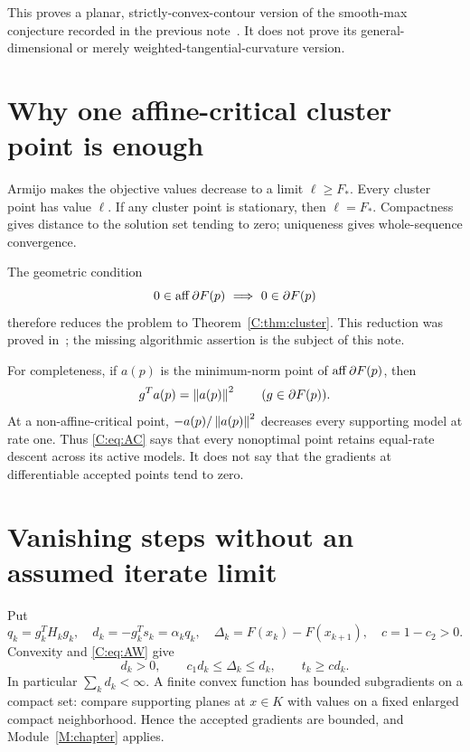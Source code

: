 \documentclass[10pt,oneside,openany]{book}
\theoremstyle{remark}\newtheorem{remark}{Remark}[chapter]
\begin{document}
This proves a planar, strictly-convex-contour version of the smooth-max conjecture recorded in the previous note~\cite{SA}. It does not prove its general-dimensional or merely weighted-tangential-curvature version.


\setcounter{section}{1}
\setcounter{theorem}{3}
\setcounter{equation}{3}
\section{Why one affine-critical cluster point is enough}
Armijo makes the objective values decrease to a limit $\ell\ge F_*$. Every cluster point has value $\ell$. If any cluster point is stationary, then $\ell=F_*$. Compactness gives distance to the solution set tending to zero; uniqueness gives whole-sequence convergence.

The geometric condition
\begin{equation}\label{C:eq:AC}
 0\in\operatorname{aff}\partial F(p)\ \Longrightarrow\ 0\in\partial F(p)
\end{equation}
therefore reduces the problem to Theorem~\ref{C:thm:cluster}. This reduction was proved in~\cite{SA}; the missing algorithmic assertion is the subject of this note.

For completeness, if $a(p)$ is the minimum-norm point of $\operatorname{aff}\partial F(p)$, then
\[
 g^Ta(p)=\left\lVert a(p)\right\rVert^2\qquad(g\in\partial F(p)).
\]
At a non-affine-critical point, $-a(p)/\left\lVert a(p)\right\rVert^2$ decreases every supporting model at rate one. Thus \eqref{C:eq:AC} says that every nonoptimal point retains equal-rate descent across its active models. It does not say that the gradients at differentiable accepted points tend to zero.


\setcounter{section}{2}
\setcounter{theorem}{3}
\setcounter{equation}{4}
\section{Vanishing steps without an assumed iterate limit}
Put
\[
 q_k=g_k^TH_kg_k,\quad d_k=-g_k^Ts_k=\alpha_kq_k,\quad
 \Delta_k=F(x_k)-F(x_{k+1}),\quad c=1-c_2>0.
\]
Convexity and \eqref{C:eq:AW} give
\begin{equation}\label{C:eq:eligible}
 d_k>0,\qquad c_1d_k\le\Delta_k\le d_k,\qquad t_k\ge c d_k.
\end{equation}
In particular $\sum_k d_k<\infty$. A finite convex function has bounded subgradients on a compact set: compare supporting planes at $x\in K$ with values on a fixed enlarged compact neighborhood. Hence the accepted gradients are bounded, and Module~\ref{M:chapter} applies.
\end{document}
